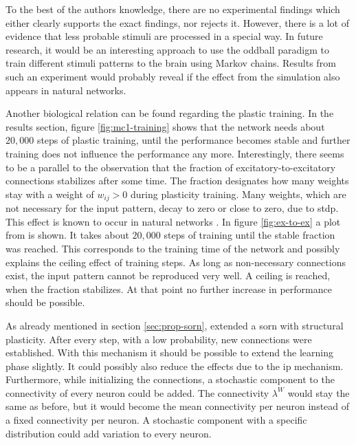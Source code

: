 To the best of the authors knowledge, there are no experimental findings which either clearly supports the exact findings, nor rejects it. However, there is a lot of evidence that less probable stimuli are processed in a special way. In future research, it would be an interesting approach to use the oddball paradigm to train different stimuli patterns to the brain using Markov chains. Results from such an experiment would probably reveal if the effect from the simulation also appears in natural networks.

Another biological relation can be found regarding the plastic training. In the results section, figure \ref{fig:mc1-training} shows that the network needs about $20,000$ steps of plastic training, until the performance becomes stable and further training does not influence the performance any more. Interestingly, there seems to be a parallel to the observation that the fraction of excitatory-to-excitatory connections stabilizes after some time. The fraction designates how many weights stay with a weight of $w_{ij} > 0$ during plasticity training. Many weights, which are not necessary for the input pattern, decay to zero or close to zero, due to \acs{stdp}. This effect is known to occur in natural networks \parencite{yasumatsu2008principles}. In figure \ref{fig:ex-to-ex} a plot from \textcite{hartmann2015s} is shown. It takes about $20,000$ steps of training until the stable fraction was reached. This corresponds to the training time of the network and possibly explains the ceiling effect of training steps. As long as non-necessary connections exist, the input pattern cannot be reproduced very well. A ceiling is reached, when the fraction stabilizes. At that point no further increase in performance should be possible.

As already mentioned in section \ref{sec:prop-sorn}, \textcite{zheng2013network} extended a \acs{sorn} with structural plasticity. After every step, with a low probability, new connections were established. With this mechanism it should be possible to extend the learning phase slightly. It could possibly also reduce the effects due to the \acs{ip} mechanism. Furthermore, while initializing the connections, a stochastic component to the connectivity of every neuron could be added. The connectivity $\lambda^W$ would stay the same as before, but it would become the mean connectivity per neuron instead of a fixed connectivity per neuron. A stochastic component with a specific distribution could add variation to every neuron.


